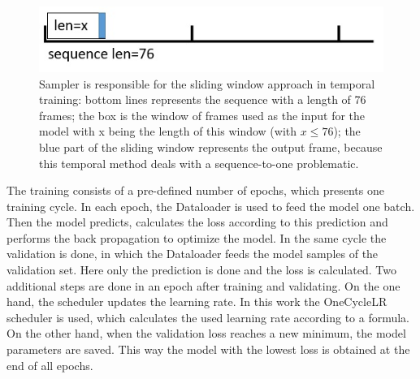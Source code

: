 \begin{figure}[H]
    \centering
    \includegraphics[width=0.5\linewidth]{PICs//usedDatasets/slidingWindow.jpg}
    \caption{Sampler is responsible for the sliding window approach in temporal training: bottom lines represents the sequence with a length of 76 frames; the box is the window of frames used as the input for the model with x being the length of this window (with $x \leq 76$); the blue part of the sliding window represents the output frame, because this temporal method deals with a sequence-to-one problematic.}
    \label{fig:slidingWindow}
\end{figure}

The training consists of a pre-defined number of epochs, which presents one training cycle.
In each epoch, the Dataloader is used to feed the model one batch.
Then the model predicts, calculates the loss according to this prediction and performs the back propagation to optimize the model.
In the same cycle the validation is done, in which the Dataloader feeds the model samples of the validation set.
Here only the prediction is done and the loss is calculated.
Two additional steps are done in an epoch after training and validating.
On the one hand, the scheduler updates the learning rate.
In this work the OneCycleLR scheduler \cite{pytorch_oneCycleLR_docu} is used, which calculates the used learning rate according to a formula.
On the other hand, when the validation loss reaches a new minimum, the model parameters are saved.
This way the model with the lowest loss is obtained at the end of all epochs.
